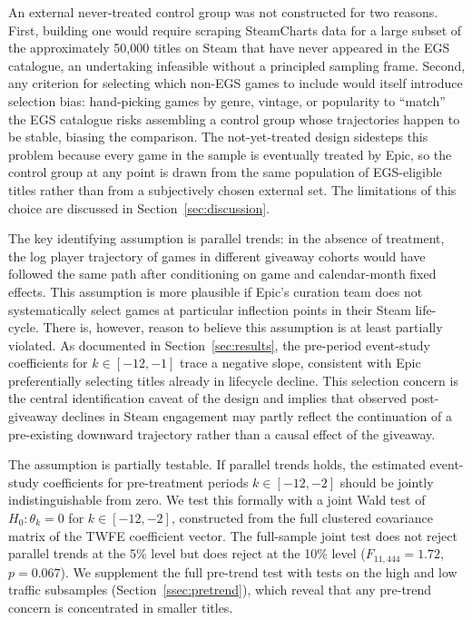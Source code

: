 \documentclass[11pt]{article}
\begin{document}
An external never-treated control group was not constructed for two reasons.
First, building one would require scraping SteamCharts data for a large subset of
the approximately 50{,}000 titles on Steam that have never appeared in the EGS
catalogue, an undertaking infeasible without a principled sampling frame.
Second, any criterion for selecting which non-EGS games to include would
itself introduce selection bias: hand-picking games by genre, vintage, or
popularity to ``match'' the EGS catalogue risks assembling a control group
whose trajectories happen to be stable, biasing the comparison.
The not-yet-treated design sidesteps this problem because every game in
the sample is eventually treated by Epic, so the control group at any point is
drawn from the same population of EGS-eligible titles rather than from a
subjectively chosen external set. The limitations of this choice are discussed
in Section~\ref{sec:discussion}.

The key identifying assumption is parallel trends: in the absence of treatment, the
log player trajectory of games in different giveaway cohorts would have followed the
same path after conditioning on game and calendar-month fixed effects. This assumption
is more plausible if Epic's curation team does not systematically
select games at particular inflection points in their Steam life-cycle. There is,
however, reason to believe this assumption is at least partially violated. As documented
in Section~\ref{sec:results}, the pre-period event-study coefficients for $k \in [-12, -1]$
trace a negative slope, consistent with Epic preferentially selecting titles
already in lifecycle decline. This selection concern is the central identification caveat
of the design and implies that observed post-giveaway declines in Steam engagement may
partly reflect the continuation of a pre-existing downward trajectory rather than a
causal effect of the giveaway.

The assumption is partially testable. If parallel trends holds, the estimated
event-study coefficients for pre-treatment periods $k \in [-12, -2]$ should be
jointly indistinguishable from zero. We test this formally with a joint Wald
test of $H_0\colon \theta_k = 0$ for $k \in [-12,-2]$, constructed from the full
clustered covariance matrix of the TWFE coefficient vector. The full-sample
joint test does not reject parallel trends at the 5\% level but does reject at the 10\% level
($F_{11, 444} = 1.72$, $p = 0.067$). We supplement
the full pre-trend test with tests on the high and low traffic subsamples
(Section~\ref{ssec:pretrend}), which reveal that any pre-trend concern is
concentrated in smaller titles.
\end{document}
